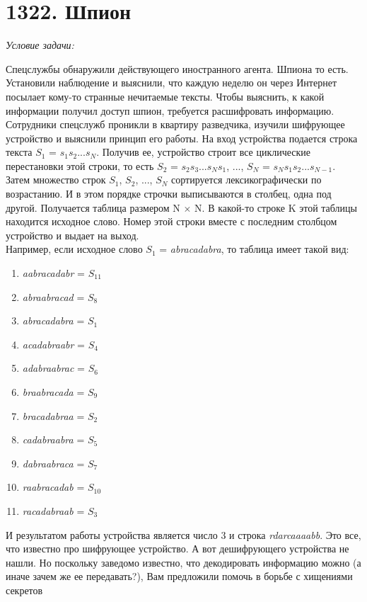 \BgThispage


\section{1322. Шпион}
\textit{Условие задачи:} \par
Спецслужбы обнаружили действующего иностранного агента. Шпиона то есть. Установили наблюдение и выяснили, что каждую
неделю он через Интернет посылает кому-то странные нечитаемые тексты. Чтобы выяснить, к какой информации получил доступ
шпион, требуется расшифровать информацию. Сотрудники спецслужб проникли в квартиру разведчика, изучили шифрующее устройство
и выяснили принцип его работы. На вход устройства подается строка текста $S_1$ = $s_1$$s_2$...$s_N$. Получив ее, устройство
строит все циклические перестановки этой строки, то есть $S_2$ = $s_2$$s_3$...$s_N$$s_1$, ..., $S_N$ = $s_N$$s_1$$s_2$...$s_{N-1}$.
Затем множество строк $S_1$, $S_2$, ..., $S_N$ сортируется лексикографически по возрастанию. И в этом порядке строчки
выписываются в столбец, одна под другой. Получается таблица размером N $\times$ N. В какой-то строке K этой таблицы
находится исходное слово. Номер этой строки вместе с последним столбцом устройство и выдает на выход.\\
Например, если исходное слово $S_1$ = \textit{abracadabra}, то таблица имеет такой вид:
\begin{enumerate}
    \item \textit{aabracadabr} = $S_11$
    \item \textit{abraabracad} = $S_8$
    \item \textit{abracadabra} = $S_1$
    \item \textit{acadabraabr} = $S_4$
    \item \textit{adabraabrac} = $S_6$
    \item \textit{braabracada} = $S_9$
    \item \textit{bracadabraa} = $S_2$
    \item \textit{cadabraabra} = $S_5$
    \item \textit{dabraabraca} = $S_7$
    \item \textit{raabracadab} = $S_10$
    \item \textit{racadabraab} = $S_3$
\end{enumerate}
И результатом работы устройства является число 3 и строка \textit{rdarcaaaabb}.
Это все, что известно про шифрующее устройство. А вот дешифрующего устройства не нашли. Но поскольку заведомо известно,
что декодировать информацию можно (а иначе зачем же ее передавать?), Вам предложили помочь в борьбе с хищениями секретов
$$
